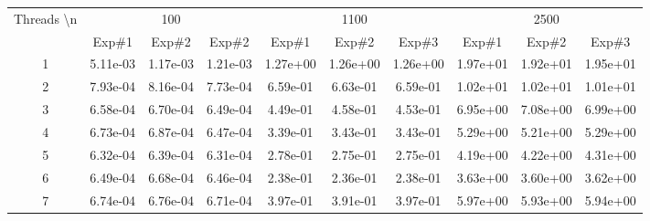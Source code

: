 \documentclass[12pt]{article}
\begin{document}
\begin{table}[htbp]
\begin{adjustbox}{angle=90}
\begin{tabular}{|c|ccc|ccc|ccc|}
\hline
\multirow{2}{*}{Threads \textbackslash n} & \multicolumn{3}{c|}{100} & \multicolumn{3}{c|}{1100} & \multicolumn{3}{c|}{2500} \\ \cline{2-10} 
 & \multicolumn{1}{c|}{Exp\#1} & \multicolumn{1}{c|}{Exp\#2} & Exp\#2 & \multicolumn{1}{c|}{Exp\#1} & \multicolumn{1}{c|}{Exp\#2} & Exp\#3 & \multicolumn{1}{c|}{Exp\#1} & \multicolumn{1}{c|}{Exp\#2} & Exp\#3 \\ \hline
1 & \multicolumn{1}{c|}{5.11e-03} & \multicolumn{1}{c|}{1.17e-03} & 1.21e-03 & \multicolumn{1}{c|}{1.27e+00} & \multicolumn{1}{c|}{1.26e+00} & 1.26e+00 & \multicolumn{1}{c|}{1.97e+01} & \multicolumn{1}{c|}{1.92e+01} & 1.95e+01 \\ \hline
2 & \multicolumn{1}{c|}{7.93e-04} & \multicolumn{1}{c|}{8.16e-04} & 7.73e-04 & \multicolumn{1}{c|}{6.59e-01} & \multicolumn{1}{c|}{6.63e-01} & 6.59e-01 & \multicolumn{1}{c|}{1.02e+01} & \multicolumn{1}{c|}{1.02e+01} & 1.01e+01 \\ \hline
3 & \multicolumn{1}{c|}{6.58e-04} & \multicolumn{1}{c|}{6.70e-04} & 6.49e-04 & \multicolumn{1}{c|}{4.49e-01} & \multicolumn{1}{c|}{4.58e-01} & 4.53e-01 & \multicolumn{1}{c|}{6.95e+00} & \multicolumn{1}{c|}{7.08e+00} & 6.99e+00 \\ \hline
4 & \multicolumn{1}{c|}{6.73e-04} & \multicolumn{1}{c|}{6.87e-04} & 6.47e-04 & \multicolumn{1}{c|}{3.39e-01} & \multicolumn{1}{c|}{3.43e-01} & 3.43e-01 & \multicolumn{1}{c|}{5.29e+00} & \multicolumn{1}{c|}{5.21e+00} & 5.29e+00 \\ \hline
5 & \multicolumn{1}{c|}{6.32e-04} & \multicolumn{1}{c|}{6.39e-04} & 6.31e-04 & \multicolumn{1}{c|}{2.78e-01} & \multicolumn{1}{c|}{2.75e-01} & 2.75e-01 & \multicolumn{1}{c|}{4.19e+00} & \multicolumn{1}{c|}{4.22e+00} & 4.31e+00 \\ \hline
6 & \multicolumn{1}{c|}{6.49e-04} & \multicolumn{1}{c|}{6.68e-04} & 6.46e-04 & \multicolumn{1}{c|}{2.38e-01} & \multicolumn{1}{c|}{2.36e-01} & 2.38e-01 & \multicolumn{1}{c|}{3.63e+00} & \multicolumn{1}{c|}{3.60e+00} & 3.62e+00 \\ \hline
7 & \multicolumn{1}{c|}{6.74e-04} & \multicolumn{1}{c|}{6.76e-04} & 6.71e-04 & \multicolumn{1}{c|}{3.97e-01} & \multicolumn{1}{c|}{3.91e-01} & 3.97e-01 & \multicolumn{1}{c|}{5.97e+00} & \multicolumn{1}{c|}{5.93e+00} & 5.94e+00 \\ \hline

\end{tabular}
\end{adjustbox}
\end{table}
\end{document}

